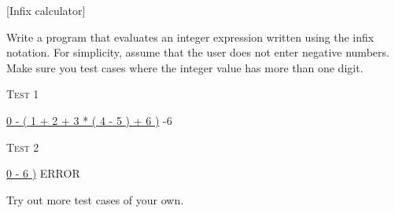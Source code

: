 [Infix calculator]

Write a program that evaluates an integer expression written using the
infix notation.
For simplicity, assume that the user does not enter negative numbers.
Make sure you test cases where the integer value has more than one digit.

\textsc{Test 1}
\begin{console}[commandchars=\\\{\},fontsize=\footnotesize]
\underline{0 - ( 1 + 2 + 3 * ( 4 - 5 ) + 6 )}
-6
\end{console}

\textsc{Test 2}
\begin{console}[commandchars=\\\{\},fontsize=\footnotesize]
\underline{0 - 6 )}
ERROR
\end{console}

Try out more test cases of your own.

